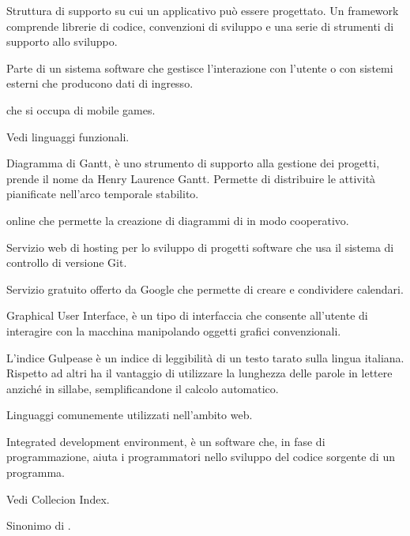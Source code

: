 Struttura di supporto su cui un applicativo può essere progettato.
Un framework comprende librerie di codice, convenzioni di sviluppo e una serie di strumenti di supporto allo sviluppo.

Parte di un sistema software che gestisce l'interazione con l'utente o con sistemi esterni che producono dati di ingresso.

 che si occupa di mobile games.

Vedi linguaggi funzionali.


Diagramma di Gantt, è uno strumento di supporto alla gestione dei progetti, prende il nome da Henry Laurence Gantt.
Permette di distribuire le attività pianificate nell'arco temporale stabilito.

 online che permette la creazione di diagrammi di  in modo cooperativo.

Servizio web di hosting per lo sviluppo di progetti software che usa il sistema di controllo di versione Git.

Servizio gratuito offerto da Google che permette di creare e condividere calendari.

Graphical User Interface, è un tipo di interfaccia che consente all'utente di interagire con la macchina manipolando oggetti grafici convenzionali.

L'indice Gulpease è un indice di leggibilità di un testo tarato sulla lingua italiana. Rispetto ad altri ha il vantaggio di utilizzare la lunghezza delle parole in lettere anziché in sillabe, semplificandone il calcolo automatico.


Linguaggi comunemente utilizzati nell'ambito web.


Integrated development environment,  è un software che, in fase di programmazione, aiuta i programmatori nello sviluppo del codice sorgente di un programma.

Vedi Collecion Index.

Sinonimo di .

